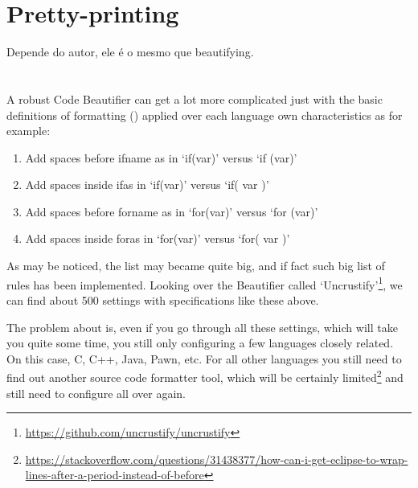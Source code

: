 \section{Pretty-printing}

Depende do autor, ele é o mesmo que beautifying.


\section{}

    A robust Code Beautifier can get a lot more complicated just with the basic
    definitions of formatting ()
    applied over each language own characteristics
    as for example:

\begin{enumerate}
    \item
        Add spaces before if\s name as in `if(var)' versus `if (var)'
    \item
        Add spaces inside if\s as in `if(var)' versus `if( var )'
    \item
        Add spaces before for\s name as in `for(var)' versus `for (var)'
    \item
        Add spaces inside for\s as in `for(var)' versus `for( var )'
\end{enumerate}

    As may be noticed, the list may became quite big,
    and if fact such big list of rules has been implemented.
    Looking over the Beautifier called
    `Uncrustify'\footnote{\url{https://github.com/uncrustify/uncrustify}},
    we can find about 500 settings with specifications like these above.

    The problem about is, even if you go through all these settings,
    which will take you quite some time,
    you still only configuring a few languages closely related.
    On this case, C, C++, Java, Pawn, etc.
    For all other languages you still need to find out another source code
    formatter tool, which will be certainly
    limited\footnote{\url{https://stackoverflow.com/questions/31438377/how-can-i-get-eclipse-to-wrap-lines-after-a-period-instead-of-before}}
    and still need to configure all over again.

